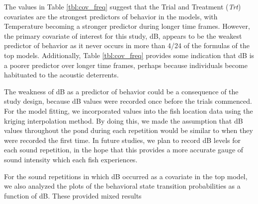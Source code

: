 \documentclass[12pt]{article}
\begin{document}
	The values in Table \ref{tbl:cov_freq} suggest that the Trial and Treatment (\emph{Trt}) covariates are the strongest predictors of behavior in the models, with Temperature becoming a stronger predictor during longer time frames. However, the primary covariate of interest for this study, dB, appears to be the weakest predictor of behavior as it never occurs in more than 4/24 of the formulas of the top models. Additionally, Table \ref{tbl:cov_freq} provides some indication that dB is a poorer predictor over longer time frames, perhaps because individuals become habituated to the acoustic deterrents. 
	
	The weakness of dB as a predictor of behavior could be a consequence of the study design, because dB values were recorded once before the trials commenced. For the model fitting, we incorporated values into the fish location data using the kriging interpolation method. By doing this, we made the assumption that dB values throughout the pond during each repetition would be similar to when they were recorded the first time. In future studies, we plan to record dB levels for each sound repetition, in the hope that this provides a more accurate gauge of sound intensity which each fish experiences.
	
	For the sound repetitions in which dB occurred as a covariate in the top model, we also analyzed the plots of the behavioral state transition probabilities as a function of dB. These provided mixed results



\end{document}

